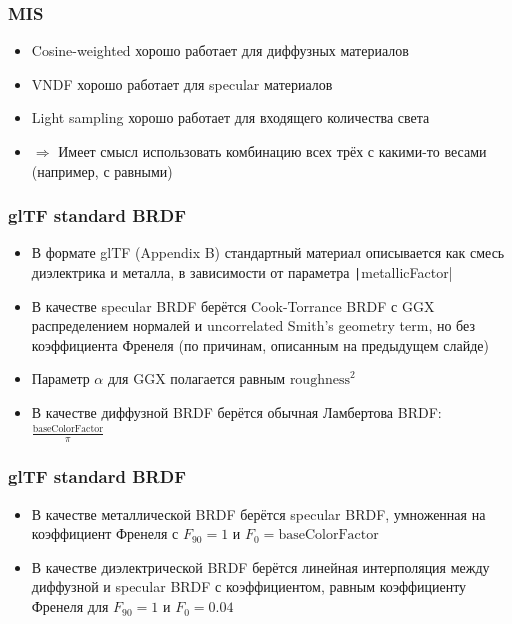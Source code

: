 \documentclass[10pt]{beamer}
\begin{document}
\begin{frame}
\frametitle{MIS}
\begin{itemize}
\item Cosine-weighted хорошо работает для диффузных материалов
\pause
\item VNDF хорошо работает для specular материалов
\pause
\item Light sampling хорошо работает для входящего количества света
\pause
\item \begin{math}\Longrightarrow\end{math} Имеет смысл использовать комбинацию всех трёх с какими-то весами (например, с равными)
\end{itemize}
\end{frame}

\begin{frame}
\frametitle{glTF standard BRDF}
\begin{itemize}
\item В формате glTF (Appendix B) стандартный материал описывается как смесь диэлектрика и металла, в зависимости от параметра \texttt|metallicFactor|
\pause
\item В качестве specular BRDF берётся Cook-Torrance BRDF с GGX распределением нормалей и uncorrelated Smith's geometry term, но без коэффициента Френеля (по причинам, описанным на предыдущем слайде)
\pause
\item Параметр \begin{math}\alpha\end{math} для GGX полагается равным \begin{math}\text{roughness}^2\end{math}
\pause
\item В качестве диффузной BRDF берётся обычная Ламбертова BRDF: \begin{math}\frac{\text{baseColorFactor}}{\pi}\end{math}
\end{itemize}
\end{frame}

\begin{frame}
\frametitle{glTF standard BRDF}
\begin{itemize}
\item В качестве металлической BRDF берётся specular BRDF, умноженная на коэффициент Френеля с \begin{math}F_{90}=1\end{math} и \begin{math}F_0=\text{baseColorFactor}\end{math}
\pause
\item В качестве диэлектрической BRDF берётся линейная интерполяция между диффузной и specular BRDF с коэффициентом, равным коэффициенту Френеля для \begin{math}F_{90}=1\end{math} и \begin{math}F_0=0.04\end{math}
\end{itemize}
\end{frame}
\end{document}
